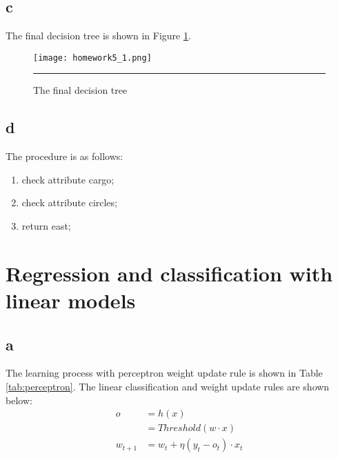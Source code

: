 \documentclass[12pt]{article}
\begin{document}
\subsection{c}
The final decision tree is shown in Figure \ref{fig:decision_tree}.
\begin{figure}
  \centering
      {\texttt{[image: homework5\_1.png]}} \rule{1\linewidth}{1pt}
      \caption{The final decision tree}
      \label{fig:decision_tree}
\end{figure}

\subsection{d}
The procedure is as follows:
\begin{enumerate}
  \item check attribute cargo;
  \item check attribute circles;
  \item return east;
\end{enumerate}

\section{Regression and classification with linear models}

\subsection{a}
The learning process with perceptron weight update rule is shown in Table \ref{tab:perceptron}. The linear classification and weight update rules are shown below:
\begin{align*}
  o
  &= h(x)\\
  &= Threshold(w \cdot x)\\
  w_{t+1}
  &= w_t + \eta (y_t-o_t) \cdot x_t
\end{align*}
\end{document}
